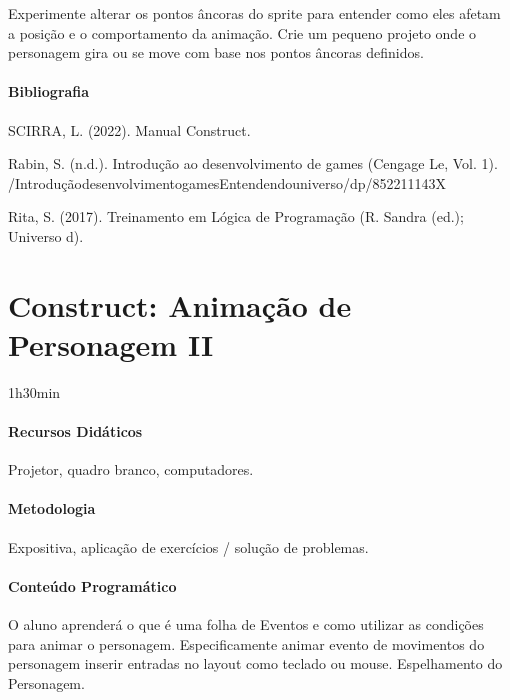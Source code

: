 \documentclass[letterpaper,10pt,brazil]{sphinxmanual}
\begin{document}
\sphinxAtStartPar
{}
Experimente alterar os pontos âncoras do sprite para entender como eles afetam a posição e o comportamento da animação.
Crie um pequeno projeto onde o personagem gira ou se move com base nos pontos âncoras definidos.
\subsubsection*{Bibliografia}

\sphinxAtStartPar
SCIRRA, L. (2022). Manual Construct.

\sphinxAtStartPar
Rabin, S. (n.d.). Introdução ao desenvolvimento de games (Cengage Le, Vol. 1).
/Introdução\sphinxhyphen{}desenvolvimento\sphinxhyphen{}games\sphinxhyphen{}Entendendo\sphinxhyphen{}universo/dp/852211143X

\sphinxAtStartPar
Rita, S. (2017). Treinamento em Lógica de Programação (R. Sandra (ed.); Universo d).

\sphinxstepscope


\chapter{Construct: Animação de Personagem II}
\label{\detokenize{modelo_aula_08:construct-animacao-de-personagem-ii}}\label{\detokenize{modelo_aula_08::doc}}
\sphinxAtStartPar
{} 1h30min
\subsubsection*{Recursos Didáticos}

\sphinxAtStartPar
Projetor, quadro branco, computadores.
\subsubsection*{Metodologia}

\sphinxAtStartPar
Expositiva, aplicação de exercícios / solução de problemas.
\subsubsection*{Conteúdo Programático}

\sphinxAtStartPar
O aluno aprenderá o que é uma folha de Eventos e como utilizar as condições para
animar o personagem. Especificamente animar evento de movimentos do
personagem inserir entradas no layout como teclado ou mouse.
Espelhamento do Personagem.
\end{document}

